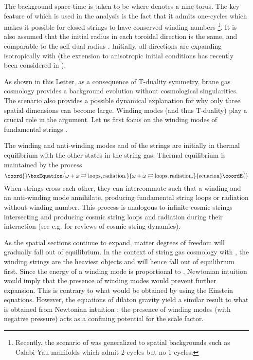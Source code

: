 \documentclass[a4paper,twocolumn,nofootinbib,tightenlines,prd,aps,
               superscriptaddress]{revtex4} %
\providecommand{\al}{\alpha}
\providecommand{\om}{\omega}
\begin{document}
The background space-time is taken to be \coordHE{}
where \coordHE{} denotes a nine-torus. The key feature of \coordHE{} which
is used in the analysis is the fact that it admits one-cycles
which makes it possible for closed strings to have conserved
winding numbers \footnote{Recently, the scenario of
\cite{Brandenberger:1989aj,Alexander:2000xv} was generalized
\cite{Easson:2001fy,Easther:2002mi} to spatial backgrounds such as
Calabi-Yau manifolds which admit 2-cycles but no 1-cycles.}. It is
also assumed that the initial radius in each toroidal direction is
the same, and comparable to the self-dual radius \myHighlight{$\al^{'1/2}$}\coordHE{}.
Initially, all directions are expanding isotropically with \myHighlight{$R >
\al^{'1/2}$}\coordHE{} (the extension to anisotropic initial conditions has
recently been considered in \cite{Watson:2002nx}).

As shown in this Letter, as a consequence of T-duality symmetry,
brane gas cosmology provides a background evolution without
cosmological singularities. The scenario also provides a possible
dynamical explanation for why only three spatial dimensions can
become large. Winding modes (and thus T-duality) play a crucial
role in the argument. Let us first focus on the winding modes of
fundamental strings \cite{Brandenberger:1989aj}.

The winding and anti-winding modes \myHighlight{$\om$}\coordHE{} and \myHighlight{$\bar{\om}$}\coordHE{}
of the strings are initially in thermal
equilibrium with the other states in the string gas. Thermal
equilibrium is maintained by the process
\begin{equation}\coord{}\boxEquation{ \label{eq:equilibrium}
    \om + \bar{\om} \rightleftarrows \rm{loops, radiation}.
}{ \om + \bar{\om} \rightleftarrows \rm{loops, radiation}.
}{ecuacion}\coordE{}\end{equation}
When strings cross each other, they can intercommute such that a
winding and an anti-winding mode annihilate, producing fundamental
string loops or radiation without winding number. This process is
analogous to infinite cosmic strings intersecting and producing
cosmic string loops and radiation during their interaction (see
e.g. \cite{VilenkinShellard,Brandenberger:1994by} for reviews of
cosmic string dynamics).

As the spatial sections continue to expand, matter degrees of
freedom will gradually fall out of equilibrium. In the context of
string gas cosmology with \myHighlight{$R > \al^{'1/2}$}\coordHE{}, the winding strings
are the heaviest objects and will hence fall out of equilibrium
first. Since the energy of a winding mode is proportional to \coordHE{},
Newtonian intuition would imply that the presence of winding modes
would prevent further expansion. This is contrary to what would be
obtained by using the Einstein equations. However, the equations
of dilaton gravity yield a similar result to what is obtained from
Newtonian intuition \cite{Tseytlin:1992xk}: the presence of
winding modes (with negative pressure) acts as a confining
potential for the scale factor.
\end{document}
